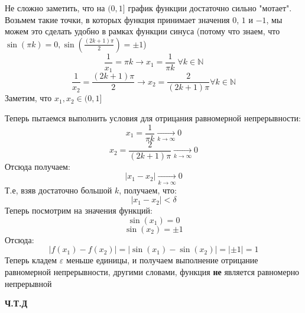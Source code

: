 \documentclass[a4paper,12pt]{article}
\begin{document}
\begin{itemize}
\begin{center}
\end{center}
Не сложно заметить, что на $(0, 1]$ график функции достаточно сильно "мотает". Возьмем такие точки, в которых функция принимает значения $0$, $1$ и $-1$, мы можем это сделать удобно в рамках функции синуса (потому что знаем, что $\sin(\pi k) = 0, \sin(\frac{(2k+1)\pi}{2}) = \pm 1$)
\[
\frac{1}{x_1} = \pi k \rightarrow x_1 = \frac{1}{\pi k} \; \forall k \in \mathbb{N}
\]
\[
\frac{1}{x_2} = \frac{(2k + 1)\pi}{2} \rightarrow x_2 = \frac{2}{(2k+1)\pi} \forall k \in \mathbb{N}
\] 
Заметим, что $x_1, x_2 \in (0, 1]$

Теперь пытаемся выполнить условия для отрицания равномерной непрерывности:
\[
x_1 =  \frac{1}{\pi k} \underset{k \rightarrow \infty}{\longrightarrow} 0 
\]
\[
x_2 =  \frac{2}{(2k+1)\pi} \underset{k \rightarrow \infty}{\longrightarrow} 0 
\]
Отсюда получаем:
\[
|x_1 - x_2| \underset{k \rightarrow \infty}{\longrightarrow} 0 
\]
Т.е, взяв достаточно большой $k$, получаем, что:
\[
|x_1 - x_2| < \delta 
\]
Теперь посмотрим на значения функций:
\[
\sin(x_1) = 0 
\]
\[
\sin(x_2) = \pm 1
\]
Отсюда:
\[
|f(x_1) - f(x_2)| = |\sin(x_1)  - \sin(x_2)| = |\pm1| = 1 
\]
Теперь кладем $\varepsilon$ меньше единицы, и получаем выполнение отрицание равномерной непрерывности, другими словами, функция \textbf{не} является равномерно непрерывной
\end{itemize}
\begin{center}
\textbf{Ч.Т.Д} 
\end{center}
\end{document}
